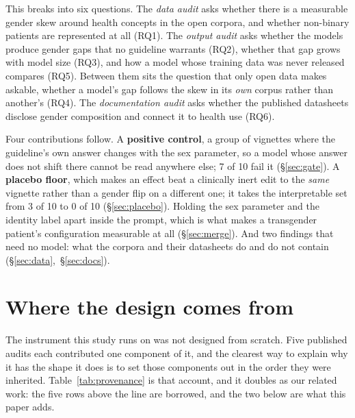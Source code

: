\documentclass[11pt,twocolumn]{article}
\begin{document}
This breaks into six questions. The \emph{data audit} asks whether there is a measurable gender skew around health concepts in the open corpora, and whether non-binary patients are represented at all (RQ1). The \emph{output audit} asks whether the models produce gender gaps that no guideline warrants (RQ2), whether that gap grows with model size (RQ3), and how a model whose training data was never released compares (RQ5). Between them sits the question that only open data makes askable, whether a model's gap follows the skew in its \emph{own} corpus rather than another's (RQ4). The \emph{documentation audit} asks whether the published datasheets disclose gender composition and connect it to health use (RQ6).

Four contributions follow. A \textbf{positive control}, a group of vignettes
where the guideline's own answer changes with the sex parameter, so a model whose
answer does not shift there cannot be read anywhere else; 7 of 10 fail it
(\S\ref{sec:gate}). A \textbf{placebo floor}, which makes an effect beat a
clinically inert edit to the \emph{same} vignette rather than a gender flip on a
different one; it takes the interpretable set from 3 of 10 to 0 of 10
(\S\ref{sec:placebo}). Holding the sex parameter and the identity label apart
inside the prompt, which is what makes a transgender patient's configuration
measurable at all (\S\ref{sec:merge}). And two findings that need no model: what
the corpora and their datasheets do and do not contain
(\S\ref{sec:data},~\S\ref{sec:docs}).


\section{Where the design comes from}

The instrument this study runs on was not designed from scratch. Five published
audits each contributed one component of it, and the clearest way to explain why
it has the shape it does is to set those components out in the order they were
inherited. Table~\ref{tab:provenance} is that account, and it doubles as our
related work: the five rows above the line are borrowed, and the two below are
what this paper adds.
\end{document}
